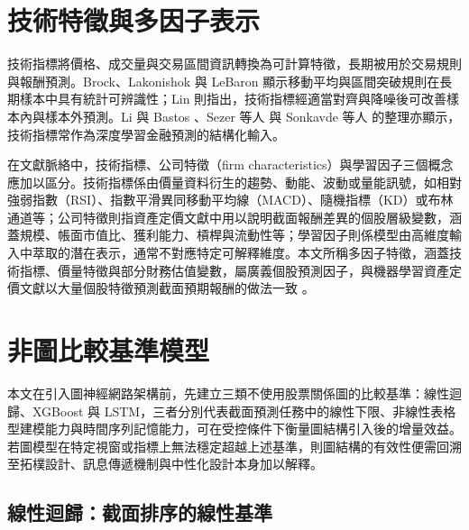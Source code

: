 \section{技術特徵與多因子表示}
\label{sec:technical_multifactor_features}

技術指標將價格、成交量與交易區間資訊轉換為可計算特徵，長期被用於交易規則與報酬預測。Brock、Lakonishok 與 LeBaron \cite{Brock1992SimpleTT} 顯示移動平均與區間突破規則在長期樣本中具有統計可辨識性；Lin \cite{LIN2018103} 則指出，技術指標經適當對齊與降噪後可改善樣本內與樣本外預測。Li 與 Bastos \cite{li2020stock}、Sezer 等人 \cite{sezer2019dl_fin_survey} 與 Sonkavde 等人 \cite{sonkavde2023review_ml_dl} 的整理亦顯示，技術指標常作為深度學習金融預測的結構化輸入。

在文獻脈絡中，技術指標、公司特徵（firm characteristics）與學習因子三個概念應加以區分。技術指標係由價量資料衍生的趨勢、動能、波動或量能訊號，如相對強弱指數（RSI）、指數平滑異同移動平均線（MACD）、隨機指標（KD）或布林通道等；公司特徵則指資產定價文獻中用以說明截面報酬差異的個股層級變數，涵蓋規模、帳面市值比、獲利能力、槓桿與流動性等；學習因子則係模型由高維度輸入中萃取的潛在表示，通常不對應特定可解釋維度。本文所稱多因子特徵，涵蓋技術指標、價量特徵與部分財務估值變數，屬廣義個股預測因子，與機器學習資產定價文獻以大量個股特徵預測截面預期報酬的做法一致 \cite{gu2020empirical,freyberger2020dissecting,kozak2020shrinking}。

\section{非圖比較基準模型}
\label{sec:non_graph_baselines}

本文在引入圖神經網路架構前，先建立三類不使用股票關係圖的比較基準：線性迴歸、XGBoost 與 LSTM，三者分別代表截面預測任務中的線性下限、非線性表格型建模能力與時間序列記憶能力，可在受控條件下衡量圖結構引入後的增量效益。若圖模型在特定視窗或指標上無法穩定超越上述基準，則圖結構的有效性便需回溯至拓樸設計、訊息傳遞機制與中性化設計本身加以解釋。

\subsection{線性迴歸：截面排序的線性基準}
\label{subsec:linear_baseline}


